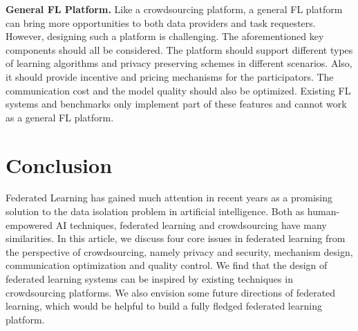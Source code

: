 \documentclass[11pt]{article}
\newcommand{\fakeparagraph}[1]{\vspace{1mm}\noindent\textbf{#1.}}
\begin{document}
\fakeparagraph{General FL Platform}
Like a crowdsourcing platform, a general FL platform can bring more opportunities to both data providers and task requesters.
However, designing such a platform is challenging.
The aforementioned key components should all be considered.
The platform should support different types of learning algorithms and privacy preserving schemes in different scenarios.
Also, it should provide incentive and pricing mechanisms for the participators.
The communication cost and the model quality should also be optimized.
Existing FL systems and benchmarks \cite{DBLP:conf/mlsys/BonawitzEGHIIKK19} only implement part of these features and cannot work as a general FL platform.

\section{Conclusion}
Federated Learning has gained much attention in recent years as a promising solution to the data isolation problem in artificial intelligence.
Both as human-empowered AI techniques, federated learning and crowdsourcing have many similarities.
In this article, we discuss four core issues in federated learning from the perspective of crowdsourcing, namely privacy and security, mechanism design, communication optimization and quality control.
We find that the design of federated learning systems can be inspired by existing techniques in crowdsourcing platforms.
We also envision some future directions of federated learning, which would be helpful to build a fully fledged federated learning platform.
\end{document}
